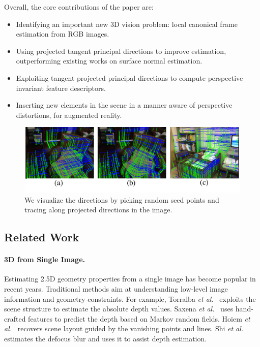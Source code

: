 Overall, the core contributions of the paper are:
     \vspace{-0.05in}
\begin{itemize}
     \item Identifying an important new 3D vision problem: local canonical frame estimation from RGB images.
    \vspace{-0.1in}
    \item Using projected tangent principal directions to improve \cframe{} estimation, outperforming existing works on surface normal estimation.
    \vspace{-0.1in}
    \item Exploiting tangent projected principal directions to compute perspective invariant feature descriptors.
    \vspace{-0.1in}
    \item Inserting new elements in the scene in a manner aware of perspective distortions, for augmented reality.
\end{itemize}
\begin{figure}
    \centering
    \includegraphics[width=\linewidth]{FrameNet/graph/illus.pdf}
    \vspace{-0.3in}
    \caption{We visualize the directions by picking random seed points and tracing along projected directions in the image. }
    \label{fig:vis-direction}
    \vspace{-0.1in}
\end{figure}

\subsection{Related Work}
\label{related:framenet}
\paragraph*{3D from Single Image.}
Estimating 2.5D geometry properties from a single image has become popular in recent years. Traditional methods aim at understanding low-level image information and geometry constraints. For example, Torralba \textit{et al.}~\cite{torralba2002depth} exploits the scene structure to estimate the absolute depth values. Saxena \textit{et al.}~\cite{saxena2006learning} uses hand-crafted features to predict the depth based on Markov random fields. Hoiem \textit{et al.}~\cite{hoiem2007recovering} recovers scene layout guided by the vanishing points and lines. Shi \textit{et al.}~\cite{shi2015break} estimates the defocus blur and uses it to assist depth estimation.


